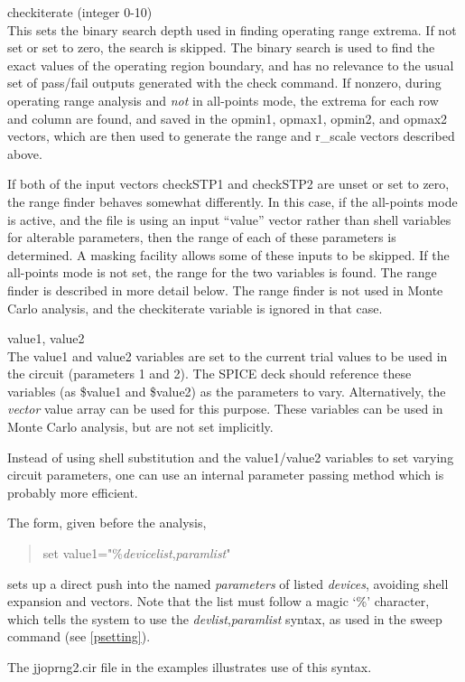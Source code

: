 \begin{description}
\item{\et checkiterate} (integer 0-10)\\
This sets the binary search depth used in finding operating range
extrema.  If not set or set to zero, the search is skipped.  The
binary search is used to find the exact values of the operating region
boundary, and has no relevance to the usual set of pass/fail outputs
generated with the {\cb check} command.  If nonzero, during operating
range analysis and {\it not} in all-points mode, the extrema for each
row and column are found, and saved in the {\et opmin1}, {\et opmax1},
{\et opmin2}, and {\et opmax2} vectors, which are then used to
generate the {\et range} and {\et r\_scale} vectors described above.

If both of the input vectors {\et checkSTP1} and {\et checkSTP2} are
unset or set to zero, the range finder behaves somewhat differently. 
In this case, if the all-points mode is active, and the file is using
an input ``value'' vector rather than shell variables for alterable
parameters, then the range of each of these parameters is determined. 
A masking facility allows some of these inputs to be skipped.  If the
all-points mode is not set, the range for the two variables is found. 
The range finder is described in more detail below.  The range finder
is not used in Monte Carlo analysis, and the {\et checkiterate}
variable is ignored in that case.

\item{\et value1, value2}\\
The {\et value1} and {\et value2} variables are set to the current
trial values to be used in the circuit (parameters 1 and 2).  The
SPICE deck should reference these variables (as {\vt \$value1} and
{\vt \$value2}) as the parameters to vary.  Alternatively, the {\it
vector} {\et value} array can be used for this purpose.  These
variables can be used in Monte Carlo analysis, but are not set
implicitly.

Instead of using shell substitution and the {\vt value1}/{\vt value2}
variables to set varying circuit parameters, one can use an internal
parameter passing method which is probably more efficient.
 
The form, given before the analysis,
\begin{quote}
{\vt set value1="\%}{\it devicelist\/}{\vt ,}{\it paramlist\/}{\vt "}
\end{quote}
sets up a direct push into the named {\it parameters} of listed {\it
devices}, avoiding shell expansion and vectors.  Note that the list
must follow a magic `{\vt \%}' character, which tells the system to
use the {\it devlist\/},{\it paramlist} syntax, as used in the {\cb
sweep} command (see \ref{psetting}).

The {\vt jjoprng2.cir} file in the examples illustrates use of this
syntax.

\end{description}

